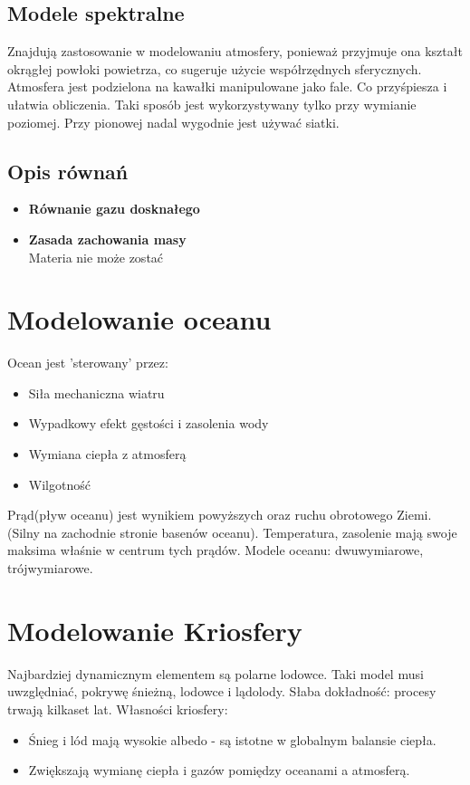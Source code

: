 \documentclass{article}
\theoremstyle{plain}
\begin{document}
\subsection{Modele spektralne}
	Znajdują zastosowanie w modelowaniu atmosfery, ponieważ przyjmuje ona kształt okrągłej powłoki powietrza, co sugeruje użycie współrzędnych sferycznych.
	Atmosfera jest podzielona na kawałki manipulowane jako fale. Co przyśpiesza i ułatwia obliczenia. Taki sposób jest wykorzystywany tylko przy wymianie poziomej. Przy pionowej nadal wygodnie jest używać siatki.  

\subsection{Opis równań}
\begin{itemize}
	\item \textbf{Równanie gazu dosknałego}
	\item \textbf{Zasada zachowania masy}\\
		Materia nie może zostać 
\end{itemize}


\section{Modelowanie oceanu}
	Ocean jest 'sterowany' przez:
	\begin{itemize}
		\item Siła mechaniczna wiatru
		\item Wypadkowy efekt gęstości i zasolenia wody
		\item Wymiana ciepła z atmosferą
		\item Wilgotność
	\end{itemize}
Prąd(pływ oceanu) jest wynikiem powyższych oraz ruchu obrotowego Ziemi.(Silny na zachodnie stronie basenów oceanu). Temperatura, zasolenie mają swoje maksima właśnie w centrum tych prądów. 
Modele oceanu: dwuwymiarowe, trójwymiarowe.

\section{Modelowanie Kriosfery}
Najbardziej dynamicznym elementem są polarne lodowce. Taki model musi uwzględniać, pokrywę śnieżną, lodowce i lądolody. Słaba dokładność: procesy trwają kilkaset lat.
Własności kriosfery:
\begin{itemize}
	\item Śnieg i lód mają wysokie albedo - są istotne w globalnym balansie ciepła. 
	\item Zwiększają wymianę ciepła i gazów pomiędzy oceanami a atmosferą.
\end{itemize}
\end{document}
